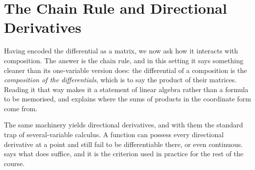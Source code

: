 \chapter{The Chain Rule and Directional Derivatives}
\label{ch:chain_rule}

Having encoded the differential as a matrix, we now ask how it interacts with composition. The
answer is the chain rule, and in this setting it says something cleaner than its one-variable
version does: the differential of a composition is the \emph{composition of the differentials},
which is to say the product of their matrices. Reading it that way makes it a statement of linear
algebra rather than a formula to be memorised, and explains where the sums of products in the
coordinate form come from.

The same machinery yields directional derivatives, and with them the standard trap of
several-variable calculus. A function can possess every directional derivative at a point and
still fail to be differentiable there, or even continuous.
 says what does suffice, and it is the criterion
used in practice for the rest of the course.






